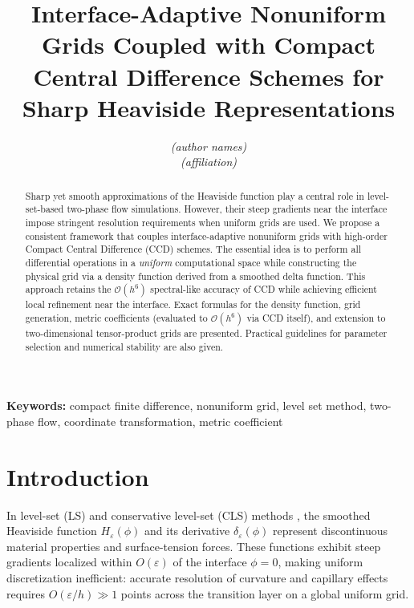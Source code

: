 \documentclass[10pt,a4paper,twocolumn]{article}
\title{%
  \textbf{Interface-Adaptive Nonuniform Grids Coupled with Compact\\
  Central Difference Schemes for Sharp Heaviside Representations}
}
\author{%
  \textit{(author names)}\\[2pt]
  \small\textit{(affiliation)}
}
\date{}
\newcommand{\Ord}[1]{\mathcal{O}(#1)}
\newcommand{\eps}{\varepsilon}
\begin{document}
\maketitle

\begin{abstract}
Sharp yet smooth approximations of the Heaviside function play a central
role in level-set-based two-phase flow simulations. However, their steep
gradients near the interface impose stringent resolution requirements when
uniform grids are used. We propose a consistent framework that couples
interface-adaptive nonuniform grids with high-order Compact Central
Difference (CCD) schemes. The essential idea is to perform all differential
operations in a \emph{uniform} computational space while constructing the
physical grid via a density function derived from a smoothed delta function.
This approach retains the $\Ord{h^6}$ spectral-like accuracy of CCD while
achieving efficient local refinement near the interface. Exact formulas for
the density function, grid generation, metric coefficients (evaluated to
$\Ord{h^6}$ via CCD itself), and extension to two-dimensional tensor-product
grids are presented. Practical guidelines for parameter selection and
numerical stability are also given.
\end{abstract}

\noindent\textbf{Keywords:} compact finite difference, nonuniform grid,
level set method, two-phase flow, coordinate transformation, metric
coefficient

\section{Introduction}
\label{sec:intro}

In level-set (LS) and conservative level-set (CLS) methods
\cite{OsherSethian1988,OlssonKreiss2005}, the smoothed Heaviside function
$H_\eps(\phi)$ and its derivative $\delta_\eps(\phi)$ represent
discontinuous material properties and surface-tension forces. These
functions exhibit steep gradients localized within $O(\eps)$ of the
interface $\phi = 0$, making uniform discretization inefficient: accurate
resolution of curvature and capillary effects requires $O(\eps/h) \gg 1$
points across the transition layer on a global uniform grid.
\end{document}
